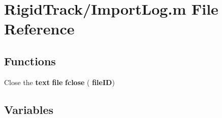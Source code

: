 \section{Rigid\+Track/\+Import\+Log.m File Reference}
\label{_import_log_8m}
\subsection*{Functions}
\begin{DoxyCompactItemize}
\item 
Close the \textbf{ text} \textbf{ file} \textbf{ fclose} (\textbf{ file\+ID})
\end{DoxyCompactItemize}
\subsection*{Variables}
